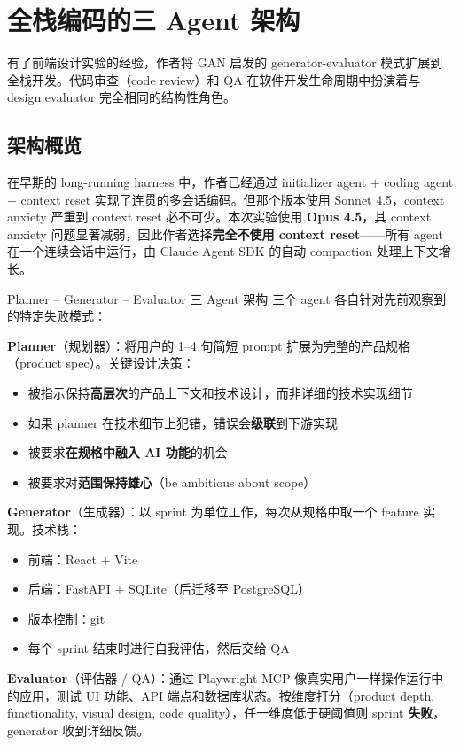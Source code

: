 \section{全栈编码的三 Agent 架构}

有了前端设计实验的经验，作者将 GAN 启发的 generator-evaluator 模式扩展到全栈开发。代码审查（code review）和 QA 在软件开发生命周期中扮演着与 design evaluator 完全相同的结构性角色。

\subsection{架构概览}

在早期的 long-running harness 中，作者已经通过 initializer agent + coding agent + context reset 实现了连贯的多会话编码。但那个版本使用 Sonnet 4.5，context anxiety 严重到 context reset 必不可少。本次实验使用 \textbf{Opus 4.5}，其 context anxiety 问题显著减弱，因此作者选择\textbf{完全不使用 context reset}——所有 agent 在一个连续会话中运行，由 Claude Agent SDK 的自动 compaction 处理上下文增长。

\begin{importantbox}{Planner -- Generator -- Evaluator 三 Agent 架构}
三个 agent 各自针对先前观察到的特定失败模式：

\textbf{Planner}（规划器）：将用户的 1--4 句简短 prompt 扩展为完整的产品规格（product spec）。关键设计决策：
\begin{itemize}[leftmargin=1.5em]
    \item 被指示保持\textbf{高层次}的产品上下文和技术设计，而非详细的技术实现细节
    \item 如果 planner 在技术细节上犯错，错误会\textbf{级联}到下游实现
    \item 被要求\textbf{在规格中融入 AI 功能}的机会
    \item 被要求对\textbf{范围保持雄心}（be ambitious about scope）
\end{itemize}

\textbf{Generator}（生成器）：以 sprint 为单位工作，每次从规格中取一个 feature 实现。技术栈：
\begin{itemize}[leftmargin=1.5em]
    \item 前端：React + Vite
    \item 后端：FastAPI + SQLite（后迁移至 PostgreSQL）
    \item 版本控制：git
    \item 每个 sprint 结束时进行自我评估，然后交给 QA
\end{itemize}

\textbf{Evaluator}（评估器 / QA）：通过 Playwright MCP 像真实用户一样操作运行中的应用，测试 UI 功能、API 端点和数据库状态。按维度打分（product depth, functionality, visual design, code quality），任一维度低于硬阈值则 sprint \textbf{失败}，generator 收到详细反馈。
\end{importantbox}

